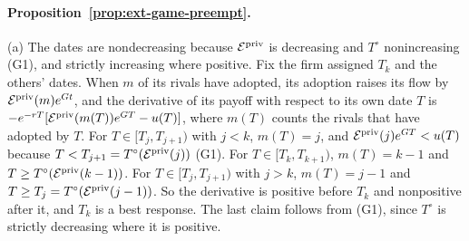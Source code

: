 \paragraph{Proposition~\ref{prop:ext-game-preempt}.} (a) The dates are nondecreasing because $\mathcal E^{\rm priv}$ is decreasing and $T^\circ$ nonincreasing (G1), and strictly increasing where positive. Fix the firm assigned $T_k$ and the others' dates. When $m$ of its rivals have adopted, its adoption raises its flow by $\mathcal E^{\rm priv}(m)e^{Gt}$, and the derivative of its payoff with respect to its own date $T$ is $-e^{-rT}[\mathcal E^{\rm priv}(m(T))e^{GT}-u(T)]$, where $m(T)$ counts the rivals that have adopted by $T$. For $T\in[T_j,T_{j+1})$ with $j<k$, $m(T)=j$, and $\mathcal E^{\rm priv}(j)e^{GT}<u(T)$ because $T<T_{j+1}=T^\circ(\mathcal E^{\rm priv}(j))$ (G1). For $T\in[T_k,T_{k+1})$, $m(T)=k-1$ and $T\ge T^\circ(\mathcal E^{\rm priv}(k-1))$. For $T\in[T_j,T_{j+1})$ with $j>k$, $m(T)=j-1$ and $T\ge T_j=T^\circ(\mathcal E^{\rm priv}(j-1))$. So the derivative is positive before $T_k$ and nonpositive after it, and $T_k$ is a best response. The last claim follows from (G1), since $T^\circ$ is strictly decreasing where it is positive.

